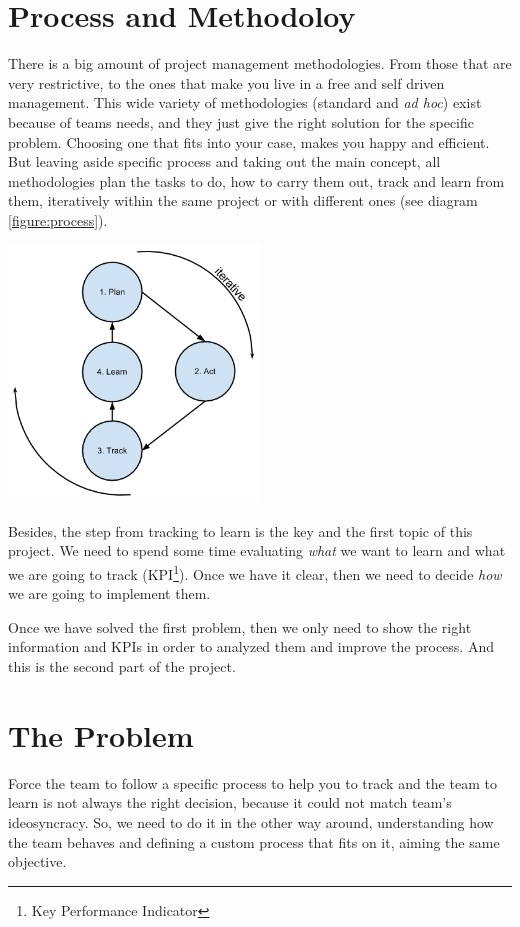 \documentclass[a4paper,12pt]{article}
\begin{document}
\begin{multicols}{2}
\section{Process and Methodoloy}
There is a big amount of project management methodologies. From those that are
very restrictive, to the ones that make you live in a free and self driven
management. This wide variety of methodologies (standard and \emph{ad hoc})
exist because of teams needs, and they just give the right solution for
the specific problem. Choosing one that fits into your case, makes you happy
and efficient. But leaving aside specific process and taking out the main concept,
all methodologies plan the tasks to do, how to carry them out, track and learn
from them, iteratively within the same project or with different ones (see diagram
\ref{figure:process}).

\begin{center}
	\includegraphics[width=0.5\textwidth]{resources/process.png}
	\label{figure:process}
\end{center}

Besides, the step from tracking to learn is the key and the first topic of this
project. We need to spend some time evaluating \emph{what} we want to learn and
what we are going to track (KPI\footnote{Key Performance Indicator}).
Once we have it clear, then we need to decide \emph{how} we are going to implement them.

Once we have solved the first problem, then we only need to show the right
information and KPIs in order to analyzed them and improve the process. And this is the
second part of the project.

\section{The Problem}
Force the team to follow a specific process to help you to track and the team to
learn is not always the right decision, because it could not match team's
ideosyncracy. So, we need to do it in the other way around, understanding how
the team behaves and defining a custom process that fits on it, aiming the same
objective.


\end{multicols}
\end{document}
